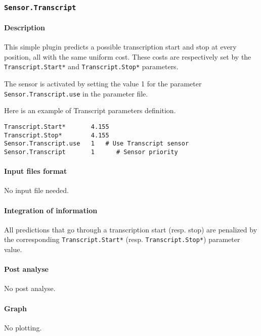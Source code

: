 
\subsubsection{\texttt{Sensor.Transcript}}

\paragraph{Description}

This simple plugin predicts a possible transcription start and stop at
every position, all with the same uniform cost. These costs are
respectively set by the \texttt{Transcript.Start*} and
\texttt{Transcript.Stop*} parameters.

The sensor is activated by setting the value 1 for the parameter
\texttt{Sensor.Transcript.use} in the parameter file. 

Here is an example of Transcript parameters definition.
\begin{Verbatim}[fontsize=\small]
Transcript.Start*       4.155
Transcript.Stop*        4.155
Sensor.Transcript.use   1   # Use Transcript sensor
Sensor.Transcript       1      # Sensor priority
\end{Verbatim}

\paragraph{Input files format}

No input file needed.

\paragraph{Integration of information}

All predictions that go through a transcription start (resp. stop) are
penalized by the corresponding \texttt{Transcript.Start*} (resp. 
\texttt{Transcript.Stop*}) parameter value.

\paragraph{Post analyse}

No post analyse.

\paragraph{Graph}

No plotting.




